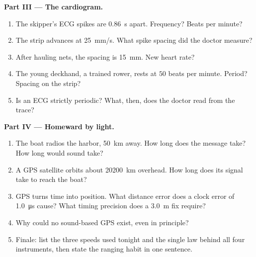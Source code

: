 \begin{problem}[{Weekend problem --- reading the world's signals: one
law, $d = v\,t$, ranges a storm, maps a seabed, counts a heartbeat and
teases out how GPS works}]
\medskip
\noindent\textbf{Part III --- The cardiogram.}
\begin{enumerate}[resume]
  \item The skipper's ECG spikes are \qty{0.86}{s} apart. Frequency?
        Beats per minute?
  \item The strip advances at \qty{25}{mm/s}. What spike spacing did the
        doctor measure?
  \item After hauling nets, the spacing is \qty{15}{mm}. New heart rate?
  \item The young deckhand, a trained rower, rests at $50$ beats per
        minute. Period? Spacing on the strip?
  \item Is an ECG strictly periodic? What, then, does the doctor read
        from the trace?
\end{enumerate}

\medskip
\noindent\textbf{Part IV --- Homeward by light.}
\begin{enumerate}[resume]
  \item The boat radios the harbor, \qty{50}{km} away. How long does the
        message take? How long would sound take?
  \item A GPS satellite orbits about \qty{20200}{km} overhead. How long
        does its signal take to reach the boat?
  \item GPS turns time into position. What distance error does a clock
        error of \qty{1.0}{\micro s} cause? What timing precision does a
        \qty{3.0}{m} fix require?
  \item Why could no sound-based GPS exist, even in principle?
  \item Finale: list the three speeds used tonight and the single law
        behind all four instruments, then state the ranging habit in one
        sentence.
\end{enumerate}
\end{problem}
